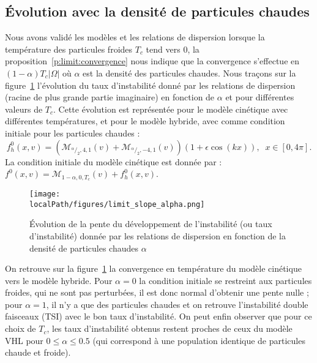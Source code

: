 \FloatBarrier
\subsection{Évolution avec la densité de particules chaudes}

Nous avons validé les modèles et les relations de dispersion lorsque la température des particules froides $T_c$ tend vers $0$, la proposition~\ref{p:limit:convergence} nous indique que la convergence s'effectue en $(1-\alpha)T_c|\Omega|$ où $\alpha$ est la densité des particules chaudes. Nous traçons sur la figure~\ref{fig:limit:slope:alpha} l'évolution du taux d'instabilité donné par les relations de dispersion (racine de plus grande partie imaginaire) en fonction de $\alpha$ et pour différentes valeurs de $T_c$. Cette évolution est représentée pour le modèle cinétique avec différentes températures, et  pour le modèle hybride, avec comme condition initiale pour les particules chaudes :
$$
  f_h^0(x,v) = \left(\mathcal{M}_{^\alpha/_2,4,1}(v) + \mathcal{M}_{^\alpha/_2,-4,1}(v)\right)(1+\epsilon\cos\left(k x\right)), \;\; x\in [0, 4\pi]. 
$$
La condition initiale du modèle cinétique est donnée par : $f^0(x,v) = \mathcal{M}_{1-\alpha,0,T_c}(v) + f_h^0(x,v)$.
\begin{figure}[h!]
  \centering
  \texttt{[image: \\localPath/figures/limit\_slope\_alpha.png]}
  \caption{Évolution de la pente du développement de l'instabilité (ou taux d'instabilité) donnée par les relations de dispersion en fonction de la densité de particules chaudes $\alpha$}
  \label{fig:limit:slope:alpha}
\end{figure}
On retrouve sur la figure~\ref{fig:limit:slope:alpha} la convergence en température du modèle cinétique vers le modèle hybride. Pour $\alpha=0$ la condition initiale se restreint aux particules froides, qui ne sont pas perturbées, il est donc normal d'obtenir une pente nulle ; pour $\alpha=1$, il n'y a que des particules chaudes et on retrouve l'instabilité double faisceaux (TSI) avec le bon taux d'instabilité. On peut enfin observer que pour ce choix de $T_c$, les taux d'instabilité obtenus restent proches de ceux du modèle VHL pour $0\leq \alpha \leq 0.5$ (qui correspond à une population identique de particules chaude et froide).

\FloatBarrier

